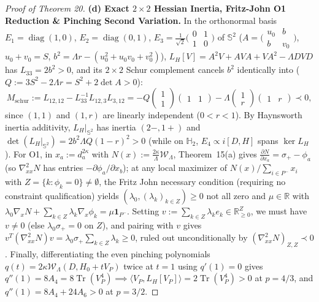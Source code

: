 \documentclass[10pt,letterpaper]{article}
\newcommand{\R}{\mathbb{R}}
\newcommand{\Tr}{\operatorname{Tr}}
\newcommand{\diag}{\operatorname{diag}}
\begin{document}
\begin{proof}[Proof of Theorem 20]
\textbf{(d) Exact $2\times 2$ Hessian Inertia, Fritz-John O1 Reduction \& Pinching Second Variation.}
In the orthonormal basis $E_1 = \diag(1,0)$, $E_2 = \diag(0,1)$, $E_3 = \frac{1}{\sqrt{2}}\bigl(\begin{smallmatrix} 0 & 1 \\ 1 & 0 \end{smallmatrix}\bigr)$ of $\mathbb{S}^2$ ($A = \bigl(\begin{smallmatrix} u_0 & b \\ b & v_0 \end{smallmatrix}\bigr)$, $u_0+v_0 = S$, $b^2 = \Lambda r - (u_0^2+u_0 v_0+v_0^2)$), $L_H[V] = A^2 V + AVA + VA^2 - \Lambda DVD$ has $L_{33} = 2b^2 > 0$, and its $2\times 2$ Schur complement cancels $b^2$ identically into ($Q := 3S^2 - 2\Lambda r = S^2 + 2\det A > 0$):
\[
  M_{\mathrm{schur}} := L_{12,12} - L_{33}^{-1} L_{12,3} L_{3,12}
  = -Q\begin{pmatrix} 1 \\ 1 \end{pmatrix}\begin{pmatrix} 1 & 1 \end{pmatrix} - \Lambda\begin{pmatrix} 1 \\ r \end{pmatrix}\begin{pmatrix} 1 & r \end{pmatrix} \prec 0,
\]
since $(1,1)$ and $(1,r)$ are linearly independent ($0 < r < 1$). By Haynsworth inertia additivity, $L_H|_{\mathbb{S}^2}$ has inertia $(2-, 1+)$ and $\det(L_H|_{\mathbb{S}^2}) = 2b^2\Lambda Q(1-r)^2 > 0$ (while on $\mathbb{H}_2$, $E_4 \propto i[D,H]$ spans $\ker L_H$). For O1, in $x_a := d_a^{2\kappa}$ with $N(x) := \frac{2\kappa}{\Lambda}\mathcal{W}_\Lambda$, Theorem~15(a) gives $\frac{\partial N}{\partial x_a} = \sigma_+ - \phi_a$ (so $\nabla^2_{xx} N$ has entries $-\partial\phi_a/\partial x_b$); at any local maximizer of $N(x)/\sum_{i\in P^-} x_i$ with $Z = \{k : \phi_k = 0\} \neq \emptyset$, the Fritz John necessary condition (requiring no constraint qualification) yields $(\lambda_0, (\lambda_k)_{k\in Z}) \ge 0$ not all zero and $\mu \in \R$ with $\lambda_0\nabla_x N + \sum_{k\in Z}\lambda_k\nabla_x\phi_k = \mu\mathbf{1}_{P^-}$. Setting $v := \sum_{k\in Z}\lambda_k e_k \in \R_{\ge 0}^Z$, we must have $v \neq 0$ (else $\lambda_0 \sigma_+ = 0$ on $Z$), and pairing with $v$ gives $v^T(\nabla^2_{xx} N) v = \lambda_0\sigma_+\sum_{k\in Z}\lambda_k \ge 0$, ruled out unconditionally by $(\nabla^2_{xx} N)_{Z,Z} \prec 0$. Finally, differentiating the even pinching polynomials $q(t) = 2\kappa\mathcal{W}_\Lambda(D, H_0 + tV_P)$ twice at $t = 1$ using $q'(1) = 0$ gives $q''(1) = 8A_4 = 8\Tr(V_P^4) \implies \langle V_P, L_H[V_P]\rangle = 2\Tr(V_P^4) > 0$ at $p = 4/3$, and $q''(1) = 8A_4 + 24A_6 > 0$ at $p = 3/2$.
\end{proof}
\end{document}
